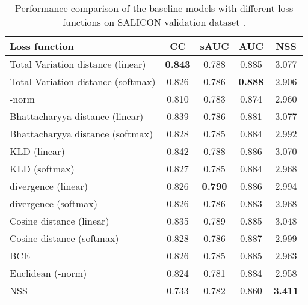 \begin{table}[]
	\centering
	\scriptsize
	\caption{Performance comparison of the baseline models with different loss functions on SALICON validation dataset \cite{jiang2015salicon}.}
	\label{table:losscompare}
	\begin{tabular}{|l|c c c c|}
		\hline
		Loss function                      & CC    & sAUC  & AUC   & NSS   \\ \hline \hline
		Total Variation distance (linear)  & \textbf{0.843} & 0.788 & 0.885 & 3.077 \\ \hline
		Total Variation distance (softmax) & 0.826 & 0.786 & \textbf{0.888} & 2.906 \\ \hline
		-norm                & 0.810  & 0.783 & 0.874 & 2.960  \\ \hline \hline
		Bhattacharyya distance (linear)    & 0.839 & 0.786 & 0.881 & 3.077 \\ \hline
		Bhattacharyya distance (softmax)   & 0.828 & 0.785 & 0.884 & 2.992 \\ \hline \hline
		KLD (linear)             & 0.842 & 0.788 & 0.886 & 3.070  \\ \hline
		KLD (softmax)            & 0.827 & 0.785 & 0.884 & 2.968 \\ \hline\hline
		 divergence (linear)             & 0.826 & \textbf{0.790}  & 0.886 & 2.994 \\ \hline
		 divergence (softmax)            & 0.826 & 0.786 & 0.883 & 2.968 \\ \hline \hline
		Cosine distance (linear)           & 0.835 & 0.789 & 0.885 & 3.048 \\ \hline
		Cosine distance (softmax)          & 0.828 & 0.786 & 0.887 & 2.999 \\ \hline \hline
		BCE               & 0.826 & 0.785 & 0.885 & 2.963 \\ \hline
		Euclidean (-norm)                          & 0.824 & 0.781 & 0.884 & 2.958 \\ \hline\hline
		NSS                                & 0.733 & 0.782 & 0.860  & \textbf{3.411} \\ \hline
	\end{tabular}
\end{table} 





